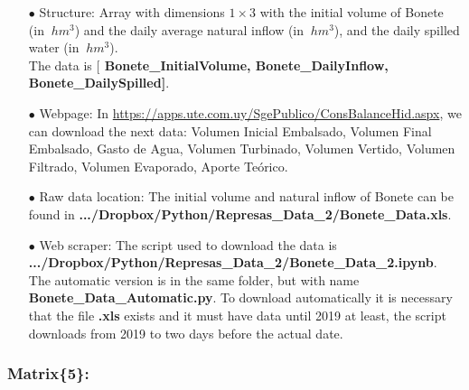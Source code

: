 \documentclass[12pt]{article}
\theoremstyle{definition}
\theoremstyle{remark}
\begin{document}
\begin{enumerate}

\item[$\bullet$] Structure: Array with dimensions $1\times3$ with the initial volume of Bonete (in $\SI{}{hm^3}$) and the daily average natural inflow (in $\SI{}{hm^3}$), and the daily spilled water (in $\SI{}{hm^3}$).\\
The data is [\textbf{{\color{blue} Bonete\_InitialVolume, Bonete\_DailyInflow, Bonete\_DailySpilled}]}.

\item[$\bullet$] Webpage: In {\color{blue} \url{https://apps.ute.com.uy/SgePublico/ConsBalanceHid.aspx}}, we can download the next data: {\color{orange} Volumen Inicial Embalsado, Volumen Final Embalsado, Gasto de Agua,  Volumen Turbinado, Volumen Vertido, Volumen Filtrado, Volumen Evaporado, Aporte Te\'orico}.

\item[$\bullet$] Raw data location: The initial volume and natural inflow of Bonete can be found in \textbf{.../Dropbox/Python/Represas\_Data\_2/Bonete\_Data.xls}.

\item[$\bullet$] Web scraper: The script used to download the data is \textbf{.../Dropbox/Python/Represas\_Data\_2/Bonete\_Data\_2.ipynb}. The automatic version is in the same folder, but with name \textbf{Bonete\_Data\_Automatic.py}. To download automatically it is necessary that the file \textbf{.xls} exists and it must have data until 2019 at least, the script downloads from 2019 to two days before the actual date.

\end{enumerate}

\subsubsection{Matrix\{5\}:}
\end{document}
